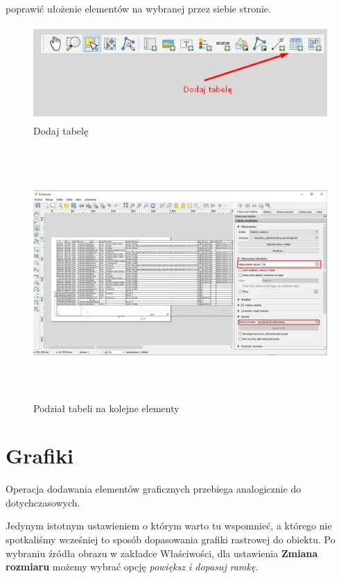 \documentclass[12pt,a4paper]{book}
\begin{document}
poprawić ułożenie elementów na wybranej przez siebie stronie.
\begin{center}
\begin{figure}
\includegraphics[width=12.298cm,height=3.637cm]{008-tabela.png}
\caption{Dodaj tabelę}
\end{figure}
\end{center}
\begin{center}
\begin{figure}
\includegraphics[width=17cm,height=9.571cm]{008-tabela-elementy.jpg}
\caption{Podział tabeli na kolejne elementy}
\end{figure}
\end{center}

\section{Grafiki}
Operacja dodawania elementów graficznych przebiega analogicznie do dotychczasowych.

Jedynym istotnym ustawieniem o którym warto tu wspomnieć, a którego nie spotkaliśmy wcześniej to sposób dopasowania grafiki rastrowej do obiektu. Po wybraniu źródła obrazu w zakładce Właściwości, dla ustawienia \textbf{Zmiana rozmiaru} możemy wybrać opcję \textit{powiększ i dopasuj ramkę.}
\end{document}
